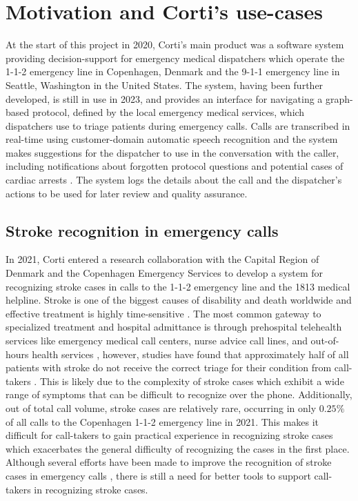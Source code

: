 \section{Motivation and Corti's use-cases}
%
%
At the start of this project in 2020, Corti's main product was a software system providing decision-support for emergency medical dispatchers which operate the 1-1-2 emergency line in Copenhagen, Denmark and the 9-1-1 emergency line in Seattle, Washington in the United States.
The system, having been further developed, is still in use in 2023, and provides an interface for navigating a graph-based protocol, defined by the local emergency medical services, which dispatchers use to triage patients during emergency calls. 
Calls are transcribed in real-time using customer-domain automatic speech recognition and the system makes suggestions for the dispatcher to use in the conversation with the caller, including notifications about forgotten protocol questions \cite{havtorn_multiqt_2020} and potential cases of cardiac arrests \cite{cite15, cite14}. The system logs the details about the call and the dispatcher's actions to be used for later review and quality assurance. 


\subsection{Stroke recognition in emergency calls}
%
In 2021, Corti entered a research collaboration with the Capital Region of Denmark and the Copenhagen Emergency Services to develop a system for recognizing stroke cases in calls to the 1-1-2 emergency line and the 1813 medical helpline. 
Stroke is one of the biggest causes of disability and death worldwide \cite{cite1,cite2,cite3} and effective treatment is highly time-sensitive \cite{cite4,cite5}. The most common gateway to specialized treatment and hospital admittance is through prehospital telehealth services like emergency medical call centers, nurse advice call lines, and out-of-hours health services \cite{cite6,cite7}, however, studies have found that approximately half of all patients with stroke do not receive the correct triage for their condition from call-takers \cite{cite10,cite11,cite12}. 
This is likely due to the complexity of stroke cases which exhibit a wide range of symptoms that can be difficult to recognize over the phone. Additionally, out of total call volume, stroke cases are relatively rare, occurring in only $0.25\%$ of all calls to the Copenhagen 1-1-2 emergency line in 2021. This makes it difficult for call-takers to gain practical experience in recognizing stroke cases which exacerbates the general difficulty of recognizing the cases in the first place. Although several efforts have been made to improve the recognition of stroke cases in emergency calls \cite{cite13,cite14,cite15}, there is still a need for better tools to support call-takers in recognizing stroke cases.

